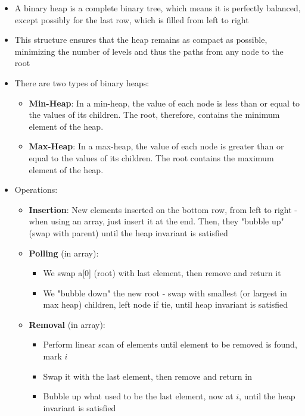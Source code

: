 \documentclass{article}
\begin{document}
\begin{itemize}
    \item A binary heap is a complete binary tree, which means it is perfectly balanced, except possibly for the last row, which is filled from left to right
    \item This structure ensures that the heap remains as compact as possible, minimizing the number of levels and thus the paths from any node to the root
    \item There are two types of binary heaps:
    \begin{itemize}
        \item \textbf{Min-Heap}: In a min-heap, the value of each node is less than or equal to the values of its children. The root, therefore, contains the minimum element of the heap.
        \item \textbf{Max-Heap}: In a max-heap, the value of each node is greater than or equal to the values of its children. The root contains the maximum element of the heap.
    \end{itemize}
    \item Operations:
    \begin{itemize}
        \item \textbf{Insertion}: New elements inserted on the bottom row, from left to right - when using an array, just insert it at the end. Then, they "bubble up" (swap with parent) until the heap invariant is satisfied
        \item \textbf{Polling} (in array):
        \begin{itemize}
            \item We swap a[0] (root) with last element, then remove and return it
            \item We "bubble down" the new root - swap with smallest (or largest in max heap) children, left node if tie, until heap invariant is satisfied
        \end{itemize}
        \item \textbf{Removal} (in array):
        \begin{itemize}
            \item Perform linear scan of elements until element to be removed is found, mark $i$
            \item Swap it with the last element, then remove and return in
            \item Bubble up what used to be the last element, now at $i$, until the heap invariant is satisfied
        \end{itemize}

\end{itemize}
\end{itemize}
\end{document}
